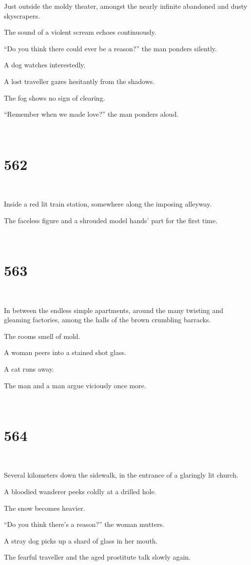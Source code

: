 \documentclass{report}
\begin{document}
Just outside the moldy theater, amongst the nearly infinite abandoned and dusty skyscrapers.

The sound of a violent scream echoes continuously.

``Do you think there could ever be a reason?'' the man ponders silently.

A dog watches interestedly.

A lost traveller gazes hesitantly from the shadows.

The fog shows no sign of clearing.

``Remember when we made love?'' the man ponders aloud.

~
\chapter*{562}
~

Inside a red lit train station, somewhere along the imposing alleyway.

The faceless figure and a shrouded model hands' part for the first time.

~
\chapter*{563}
~

In between the endless simple apartments, around the many twisting and gleaming factories, among the halls of the brown crumbling barracks.

The rooms smell of mold.

A woman peers into a stained shot glass.

A cat runs away.

The man and a man argue viciously once more.

~
\chapter*{564}
~

Several kilometers down the sidewalk, in the entrance of a glaringly lit church.

A bloodied wanderer peeks coldly at a drilled hole.

The snow becomes heavier.

``Do you think there's a reason?'' the woman mutters.

A stray dog picks up a shard of glass in her mouth.

The fearful traveller and the aged prostitute talk slowly again.
\end{document}
